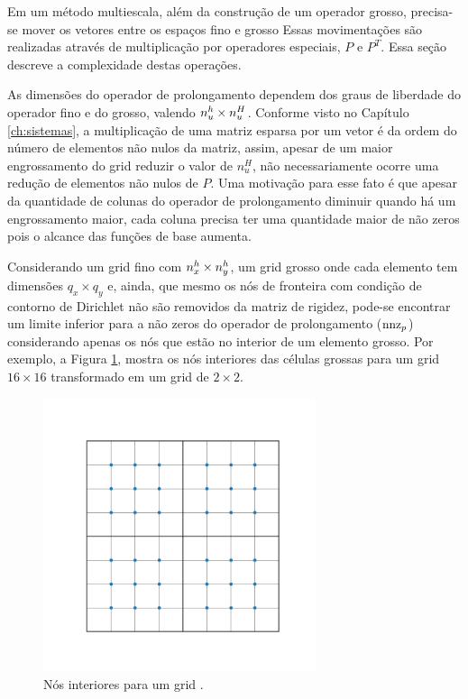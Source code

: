 Em um método multiescala, além da construção de um operador grosso,  precisa-se mover os vetores entre os espaços fino e grosso  Essas movimentações são realizadas através de multiplicação por operadores especiais, $P$ e $P^T$. Essa seção descreve a complexidade destas operações.

As dimensões do operador de prolongamento dependem dos graus de liberdade do operador fino e do  grosso, valendo $n_u^h \times n_u^H$. Conforme visto no Capítulo \ref{ch:sistemas}, a multiplicação de uma matriz esparsa por um vetor é da ordem do número de elementos  não nulos da matriz, assim, apesar de um maior engrossamento do grid reduzir o valor de $n_u^H$,  não necessariamente ocorre  uma redução de elementos não nulos de $P$. Uma motivação para esse fato é que apesar da quantidade de colunas do operador de prolongamento diminuir quando há um engrossamento maior, cada coluna precisa ter uma quantidade maior de não zeros pois o alcance das funções de base aumenta.

Considerando um grid fino com $n^h_x \times n^h_y$, um grid grosso onde cada elemento tem dimensões $q_x \times q_y$ e, ainda, que mesmo os nós de fronteira com condição de contorno de Dirichlet não são removidos da matriz de rigidez, pode-se encontrar um limite inferior para a não zeros do operador de prolongamento ($\text{nnz}_p$) considerando apenas os nós que estão no interior de um elemento grosso. Por exemplo, a Figura \ref{fig:nosinteriores}, mostra os nós interiores das células grossas para um grid $16\times16$ transformado em um grid de $2\times2$. 

\begin{figure}[!htbp]
\centering
\includegraphics[width=8cm]{chap06/figs/nosinteriores.png}
\caption{Nós interiores para um grid .}
\label{fig:nosinteriores}
\end{figure}

